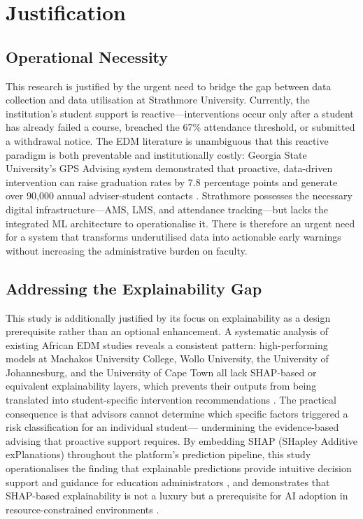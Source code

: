 \documentclass[12pt]{report}
\begin{document}
\section{Justification}

\subsection{Operational Necessity}
This research is justified by the urgent need to bridge the gap between data
collection and data utilisation at Strathmore University. Currently, the
institution's student support is reactive---interventions occur only after a
student has already failed a course, breached the 67\% attendance threshold, or
submitted a withdrawal notice. The EDM literature is unambiguous that this
reactive paradigm is both preventable and institutionally costly: Georgia State
University's GPS Advising system demonstrated that proactive, data-driven
intervention can raise graduation rates by 7.8 percentage points and generate
over 90{,}000 annual adviser-student contacts \parencite{gsu2024_}. Strathmore
possesses the necessary digital infrastructure---AMS, LMS, and attendance
tracking---but lacks the integrated ML architecture to operationalise it. There
is therefore an urgent need for a system that transforms underutilised data into
actionable early warnings without increasing the administrative burden on faculty.

\subsection{Addressing the Explainability Gap}
This study is additionally justified by its focus on explainability as a design
prerequisite rather than an optional enhancement. A systematic analysis of
existing African EDM studies reveals a consistent pattern: high-performing models
at Machakos University College, Wollo University, the University of Johannesburg,
and the University of Cape Town all lack SHAP-based or equivalent explainability
layers, which prevents their outputs from being translated into student-specific
intervention recommendations \parencite{esmael2024, hassen2020, ngemu2015,
taodzera2016}. The practical consequence is that advisors cannot determine which
specific factors triggered a risk classification for an individual student---
undermining the evidence-based advising that proactive support requires. By
embedding SHAP (SHapley Additive exPlanations) throughout the platform's
prediction pipeline, this study operationalises the finding that explainable
predictions provide intuitive decision support and guidance for education
administrators \parencite{zhang2021}, and demonstrates that SHAP-based
explainability is not a luxury but a prerequisite for AI adoption in
resource-constrained environments \parencite{kwakye2025}.
\end{document}
